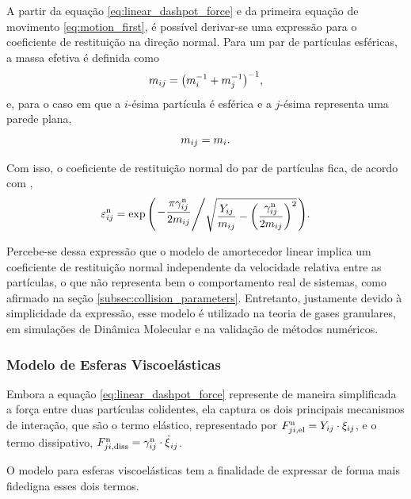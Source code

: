 A partir da equação \eqref{eq:linear_dashpot_force} e da primeira equação de movimento \eqref{eq:motion_first}, é possível derivar-se uma expressão para o coeficiente de restituição na direção normal. Para um par de partículas esféricas, a massa efetiva é definida como
\begin{equation*}
	\massij = \pqty{\massi^{-1} + \massj^{-1}}^{-1},
\end{equation*}
e, para o caso em que a \(i\)-ésima partícula é esférica e a \(j\)-ésima representa uma parede plana,
\begin{equation*}
	{m}_{i j} = {m}_{i}.
\end{equation*}

Com isso, o coeficiente de restituição normal do par de partículas fica, de acordo com ,
\begin{equation*}
	\normalCoefficientOfRestitutionij = \exp\pqty{
		\bigslant{
			-\dfrac{\pi\normalDampingConstantij}{2\massij}
		}{
			\sqrt{\dfrac{\elasticModulusij}{\massij} - \pqty{\dfrac{\normalDampingConstantij}{2\massij}}^2}
		}
	}.
\end{equation*}

Percebe-se dessa expressão que o modelo de amortecedor linear implica um coeficiente de restituição normal independente da velocidade relativa entre as partículas, o que não representa bem o comportamento real de sistemas, como afirmado na seção \ref{subsec:collision_parameters}. Entretanto, justamente devido à simplicidade da expressão, esse modelo é utilizado na teoria de gases granulares, em simulações de Dinâmica Molecular e na validação de métodos numéricos.

\subsubsection*{Modelo de Esferas Viscoelásticas}

Embora a equação \eqref{eq:linear_dashpot_force} represente de maneira simplificada a força entre duas partículas colidentes, ela captura os dois principais mecanismos de interação, que são o termo elástico, representado por \(F_{ji,\text{el}}^{\text{n}} = {Y}_{i j}\cdot{\xi}_{i j}\), e o termo dissipativo, \(\normalDissipativeForceji = \normalDampingConstantij\cdot\overlapDerivativeij\).

O modelo para esferas viscoelásticas tem a finalidade de expressar de forma mais fidedigna esses dois termos.

